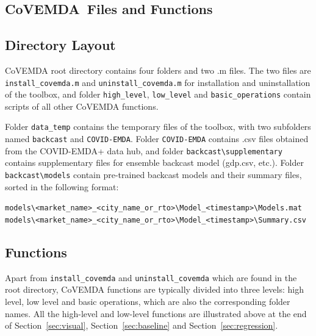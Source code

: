 \documentclass[10pt]{article}
\newcommand{\covemda}{CoVEMDA}
\numberwithin{equation}{section}
\numberwithin{table}{section}
\numberwithin{figure}{section}
\begin{document}
\begin{appendices}

\newpage
\section{\covemda{}~Files and Functions} \label{sec:}

\subsection{Directory Layout}

\covemda{} root directory contains four folders and two .m files. The two files are \verb!install_covemda.m! and \verb!uninstall_covemda.m! for installation and uninstallation of the toolbox, and folder \verb!high_level!, \verb!low_level! and \verb!basic_operations! contain scripts of all other \covemda{} functions.

Folder \verb!data_temp! contains the temporary files of the toolbox, with two subfolders named \verb!backcast! and \verb!COVID-EMDA!. Folder \verb!COVID-EMDA! contains .csv files obtained from the COVID-EMDA+ data hub, and folder \verb!backcast\supplementary! contains supplementary files for ensemble backcast model (gdp.csv, etc.). Folder \verb!backcast\models! contain pre-trained backcast models and their summary files, sorted in the following format:
\begin{center}
    \verb!models\<market_name>_<city_name_or_rto>\Model_<timestamp>\Models.mat!
    \verb!models\<market_name>_<city_name_or_rto>\Model_<timestamp>\Summary.csv!
\end{center}



\subsection{Functions}  \label{subsec:func_list}

Apart from \verb!install_covemda! and \verb!uninstall_covemda! which are found in the root directory, \covemda{} functions are typically divided into three levels: high level, low level and basic operations, which are also the corresponding folder names. All the high-level and low-level functions are illustrated above at the end of Section~\ref{sec:visual}, Section~\ref{sec:baseline} and Section~\ref{sec:regression}.


\end{appendices}
\end{document}
